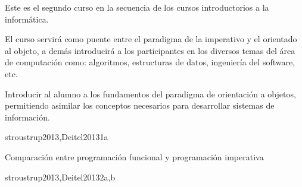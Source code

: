 
\begin{syllabus}


\begin{justification}
Este es el segundo curso en la secuencia de los cursos introductorios a la informática.

El curso servirá como puente entre el paradigma de la imperativo y el orientado al objeto, a demás introducirá a los participantes en los diversos temas del área de computación como: algoritmos, estructuras de datos, ingeniería del software, etc.
\end{justification}

\begin{goals}
\item Introducir al alumno a los fundamentos del paradigma de
      orientación a objetos, permitiendo asimilar los conceptos
      necesarios para desarrollar  sistemas de información.
\end{goals}

\begin{outcomes}
\end{outcomes}

\begin{unit}{\PLOverviewDef}{stroustrup2013,Deitel2013}{1}{a}
   \begin{topics}
      \item \PLOverviewTopicBrief
      \item Comparación entre programación funcional y programación imperativa
      \item \PLOverviewTopicHistory
   \end{topics}

   \begin{unitgoals}
      \item \PLOverviewObjONE
      \item \PLOverviewObjTWO
      \item \PLOverviewObjTHREE
   \end{unitgoals}
\end{unit}

\begin{unit}{\PLVirtualMachinesDef}{stroustrup2013,Deitel2013}{2}{a,b}
   \begin{topics}
      \item \PLVirtualMachinesTopicETheconcept%
      \item \PLVirtualMachinesTopicHierarchy%
      \item \PLVirtualMachinesTopicIntermediate%
   \end{topics}


\end{unit}
\end{syllabus}
